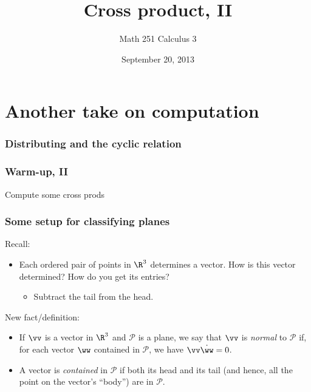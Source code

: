 \documentclass[11pt,ignorenonframetext,]{beamer}
\title{Cross product, II}
\author{Math 251 Calculus 3}
\date{September 20, 2013 }
\begin{document}
\frame{\titlepage}

\section{Another take on computation}

\begin{frame}\frametitle{Distributing and the cyclic relation}

\end{frame}

\begin{frame}\frametitle{Warm-up, II}

Compute some cross prods

\end{frame}

\begin{frame}\frametitle{Some setup for classifying planes}

Recall:

\begin{itemize}[<+->]
\itemsep1pt\parskip0pt
\item
  Each ordered pair of points in $\R^3$ determines a vector. How is this
  vector determined? How do you get its entries?

  \begin{itemize}[<+->]
  \itemsep1pt\parskip0pt
  \item
    Subtract the tail from the head.
  \end{itemize}
\end{itemize}

New fact/definition:

\begin{itemize}[<+->]
\item
  If $\vv$ is a vector in $\R^3$ and $\mathcal{P}$ is a plane, we say
  that $\vv$ is \emph{normal} to $\mathcal{P}$ if, for each vector $\ww$
  contained in $\mathcal{P}$, we have $\vv \dot \ww  = 0$.
\item
  A vector is \emph{contained} in $\mathcal{P}$ if both its head and its
  tail (and hence, all the point on the vector's ``body'') are in
  $\mathcal{P}$.
\end{itemize}

\end{frame}
\end{document}
